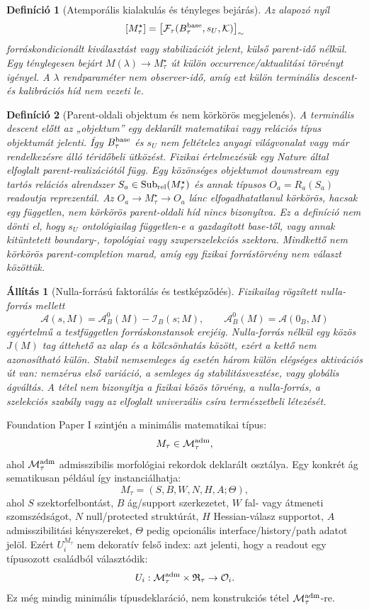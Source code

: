 \documentclass[12pt]{article}
\newtheorem{definition}{Definíció}
\newtheorem{proposition}{Állítás}
\newcommand{\RTspace}{\mathfrak R_{\tau}}
\newcommand{\Mta}{M_{\tau}}
\newcommand{\Obs}{\mathcal O}
\begin{document}
\begin{definition}[Atemporális kialakulás és tényleges bejárás]
Az alapozó nyíl
\[
 [M_\tau^\star]
 =
 \bigl[\mathcal F_\tau(B_\tau^{\rm base},s_U,\mathcal K)\bigr]_{\sim}
\]
forráskondicionált kiválasztást vagy stabilizációt jelent, külső parent-idő
nélkül. Egy ténylegesen bejárt $M(\lambda)\to M_\tau^\star$ út külön
occurrence/aktualitási törvényt igényel. A \(\lambda\) rendparaméter nem
observer-idő, amíg ezt külön terminális descent- és kalibrációs híd nem vezeti
le.
\end{definition}

\begin{definition}[Parent-oldali objektum és nem körkörös megjelenés]
A terminális descent előtt az „objektum” egy deklarált matematikai vagy
relációs típus objektumát jelenti. Így \(B_\tau^{\rm base}\) és \(s_U\) nem
feltételez anyagi világvonalat vagy már rendelkezésre álló téridőbeli
ütközést. Fizikai értelmezésük egy Nature által elfoglalt parent-realizációtól
függ. Egy közönséges objektumot downstream egy tartós relációs alrendszer
\(S_a\in\operatorname{Sub}_{\rm rel}(M_\tau^\star)\) és annak típusos
\(O_a=R_a(S_a)\) readoutja reprezentál. Az
\(O_a\to M_\tau^\star\to O_a\) lánc elfogadhatatlanul körkörös, hacsak egy
független, nem körkörös parent-oldali híd nincs bizonyítva.
Ez a definíció nem dönti el, hogy \(s_U\) ontológiailag független-e a
gazdagított base-től, vagy annak kitüntetett boundary-, topológiai vagy
szuperszelekciós szektora. Mindkettő nem körkörös parent-completion marad,
amíg egy fizikai forrástörvény nem választ közöttük.
\end{definition}

\begin{proposition}[Nulla-forrású faktorálás és testképződés]
Fizikailag rögzített nulla-forrás mellett
\[
 \mathcal A(s,M)=\mathcal A_B^0(M)-\mathcal I_B(s;M),\qquad
 \mathcal A_B^0(M)=\mathcal A(0_B,M)
\]
egyértelmű a testfüggetlen forráskonstansok erejéig.  Nulla-forrás nélkül egy
közös $J(M)$ tag áttehető az alap és a kölcsönhatás között, ezért a kettő nem
azonosítható külön.  Stabil nemsemleges ág esetén három külön elégséges
aktivációs út van: nemzérus első variáció, a semleges ág stabilitásvesztése,
vagy globális ágváltás.  A tétel nem bizonyítja a fizikai közös törvény, a
nulla-forrás, a szelekciós szabály vagy az elfoglalt univerzális csíra
természetbeli létezését.
\end{proposition}

Foundation Paper I szintjén a minimális matematikai típus:
\[
  \Mta\in\mathcal M_\tau^{\rm adm},
\]
ahol \(\mathcal M_\tau^{\rm adm}\) admisszibilis morfológiai rekordok
deklarált osztálya.  Egy konkrét ág sematikusan például így instanciálhatja:
\[
  \Mta=(S,B,W,N,H,A;\Theta),
\]
ahol \(S\) szektorfelbontást, \(B\) ág/support szerkezetet, \(W\) fal- vagy
átmeneti szomszédságot, \(N\) null/protected struktúrát, \(H\)
Hessian-válasz supportot, \(A\) admisszibilitási kényszereket, \(\Theta\) pedig
opcionális interface/history/path adatot jelöl.  Ezért \(U_i^{\Mta}\) nem
dekoratív felső index: azt jelenti, hogy a readout egy típusozott családból
választódik:
\[
  U_i:\mathcal M_\tau^{\rm adm}\times\RTspace\to\Obs_i.
\]
Ez még mindig minimális típusdeklaráció, nem konstrukciós tétel
\(\mathcal M_\tau^{\rm adm}\)-re.
\end{document}
